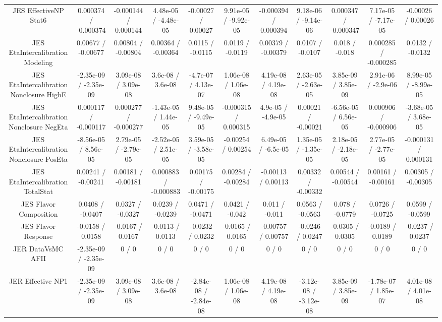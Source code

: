 \begin{table}[htbp]
\begin{center}
\begin{tabular}{|c|c|c|c|c|c|c|c|c|c|c|}
  JES EffectiveNP Stat6 & 0.000374 / -0.000374 & -0.000144 / 0.000144 & 4.48e-05 / -4.48e-05 & -0.00027 / 0.00027 & 9.91e-05 / -9.92e-05 & -0.000394 / 0.000394 & 9.18e-06 / -9.14e-06 & 0.000347 / -0.000347 & 7.17e-05 / -7.17e-05 & -0.00026 / 0.00026 \\ 
  JES EtaIntercalibration Modeling & 0.00677 / -0.00677 & 0.00804 / -0.00804 & 0.00364 / -0.00364 & 0.0115 / -0.0115 & 0.0119 / -0.0119 & 0.00379 / -0.00379 & 0.0107 / -0.0107 & 0.018 / -0.018 & 0.000285 / -0.000285 & 0.0132 / -0.0132 \\ 
  JES EtaIntercalibration Nonclosure HighE & -2.35e-09 / -2.35e-09 & 3.09e-08 / 3.09e-08 & 3.6e-08 / 3.6e-08 & -4.7e-07 / 4.13e-07 & 1.06e-08 / 1.06e-08 & 4.19e-08 / 4.19e-08 & 2.63e-05 / -2.63e-05 & 3.85e-09 / 3.85e-09 & 2.91e-06 / -2.9e-06 & 8.99e-05 / -8.99e-05 \\ 
  JES EtaIntercalibration Nonclosure NegEta & 0.000117 / -0.000117 & 0.000277 / -0.000277 & -1.43e-05 / 1.44e-05 & 9.48e-05 / -9.49e-05 & -0.000315 / 0.000315 & 4.9e-05 / -4.9e-05 & 0.00021 / -0.00021 & -6.56e-05 / 6.56e-05 & 0.000906 / -0.000906 & -3.68e-05 / 3.68e-05 \\ 
  JES EtaIntercalibration Nonclosure PosEta & -8.56e-05 / 8.56e-05 & 2.79e-05 / -2.79e-05 & -2.52e-05 / 2.51e-05 & 3.59e-05 / -3.58e-05 & -0.00254 / 0.00254 & 6.49e-05 / -6.5e-05 & 1.35e-05 / -1.35e-05 & 2.18e-05 / -2.18e-05 & 2.77e-05 / -2.77e-05 & -0.000131 / 0.000131 \\ 
  JES EtaIntercalibration TotalStat & 0.00241 / -0.00241 & 0.00181 / -0.00181 & 0.000883 / -0.000883 & 0.00175 / -0.00175 & 0.00284 / -0.00284 & -0.00113 / 0.00113 & 0.00332 / -0.00332 & 0.00544 / -0.00544 & 0.00161 / -0.00161 & 0.00305 / -0.00305 \\ 
  JES Flavor Composition & 0.0408 / -0.0407 & 0.0327 / -0.0327 & 0.0239 / -0.0239 & 0.0471 / -0.0471 & 0.0421 / -0.042 & 0.011 / -0.011 & 0.0563 / -0.0563 & 0.078 / -0.0779 & 0.0726 / -0.0725 & 0.0599 / -0.0599 \\ 
  JES Flavor Response & -0.0158 / 0.0158 & -0.0167 / 0.0167 & -0.0113 / 0.0113 & -0.0232 / 0.0232 & -0.0165 / 0.0165 & -0.00757 / 0.00757 & -0.0246 / 0.0247 & -0.0305 / 0.0305 & -0.0189 / 0.0189 & -0.0237 / 0.0237 \\ 
  JER DataVsMC AFII & -2.35e-09 / -2.35e-09 & 0 / 0 & 0 / 0 & 0 / 0 & 0 / 0 & 0 / 0 & 0 / 0 & 0 / 0 & 0 / 0 & 0 / 0 \\ 
  JER Effective NP1 & -2.35e-09 / -2.35e-09 & 3.09e-08 / 3.09e-08 & 3.6e-08 / 3.6e-08 & -2.84e-08 / -2.84e-08 & 1.06e-08 / 1.06e-08 & 4.19e-08 / 4.19e-08 & -3.12e-08 / -3.12e-08 & 3.85e-09 / 3.85e-09 & -1.78e-07 / 1.85e-07 & 4.01e-08 / 4.01e-08 \\ 

\end{tabular}
\end{center}
\end{table}
